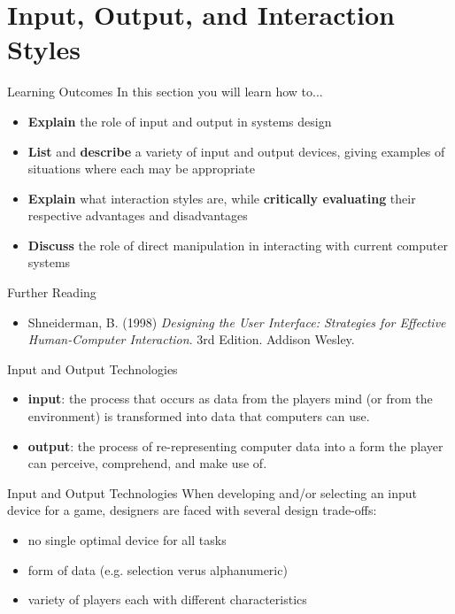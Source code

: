 \part{Input, Output, and Interaction Styles}
\frame{\partpage}

\begin{frame}{Learning Outcomes}
	In this section you will learn how to...
	
	\begin{itemize}
		\item \textbf{Explain} the role of input and output in systems design
		\item \textbf{List} and \textbf{describe} a variety of input and output devices, giving examples of situations where each may be appropriate
		\item \textbf{Explain} what interaction styles are, while \textbf{critically evaluating} their respective advantages and disadvantages
		\item \textbf{Discuss} the role of direct manipulation in interacting with current computer systems
	\end{itemize}
\end{frame}

\begin{frame}{Further Reading}
	\begin{itemize}
		\item Shneiderman, B. (1998) \textit{Designing the User Interface: Strategies for Effective Human-Computer Interaction}. 3rd Edition. Addison Wesley.
	\end{itemize}
\end{frame}

\begin{frame}{Input and Output Technologies}
	\begin{itemize}
		\item \textbf{input}: the process that occurs as data from the players mind (or from the environment) is transformed into data that computers can use.
		\item \textbf{output}: the process of re-representing computer data into a form the player can perceive, comprehend, and make use of.
	\end{itemize}
\end{frame}

\begin{frame}{Input and Output Technologies}
	When developing and/or selecting an input device for a game, designers are faced with several design trade-offs:
	
	\begin{itemize}
		\item no single optimal device for all tasks 
		\item form of data (e.g. selection verus alphanumeric)
		\item variety of players each with different characteristics
	\end{itemize}
\end{frame}

